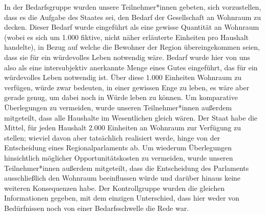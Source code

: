 \documentclass[justified,nobib,nohyper,symmetric,twoside]{tufte-book}
\begin{document}
In der Bedarfsgruppe wurden unsere Teilnehmer*innen gebeten, sich vorzustellen, dass es die Aufgabe des Staates sei, den Bedarf der Gesellschaft an Wohnraum zu decken.
Dieser Bedarf wurde eingeführt als eine gewisse Quantität an Wohnraum (wobei es sich um 1.000 fiktive, nicht näher erläuterte Einheiten pro Haushalt handelte), in Bezug auf welche die Bewohner der Region übereingekommen seien, dass sie für ein würdevolles Leben notwendig wäre.
Bedarf wurde hier von uns also als eine intersubjektiv anerkannte Menge eines Gutes eingeführt, das für ein würdevolles Leben notwendig ist.
Über diese 1.000 Einheiten Wohnraum zu verfügen, würde zwar bedeuten, in einer gewissen Enge zu leben, es wäre aber gerade genug, um dabei noch in Würde leben zu können.
Um komparative Überlegungen zu vermeiden, wurde unseren Teilnehmer*innen außerdem mitgeteilt, dass alle Haushalte im Wesentlichen gleich wären.
Der Staat habe die Mittel, für jeden Haushalt 2.000 Einheiten an Wohnraum zur Verfügung zu stellen; wieviel davon aber tatsächlich realisiert werde, hinge von der Entscheidung eines Regionalparlaments ab.
Um wiederum Überlegungen hinsichtlich möglicher Opportunitätskosten zu vermeiden, wurde unseren Teilnehmer*innen außerdem mitgeteilt, dass die Entscheidung des Parlaments ausschließlich den Wohnraum beeinflussen würde und darüber hinaus keine weiteren Konsequenzen habe.
Der Kontrollgruppe wurden die gleichen Informationen gegeben, mit dem einzigen Unterschied, dass hier weder von Bedürfnissen noch von einer Bedarfsschwelle die Rede war.
\end{document}
